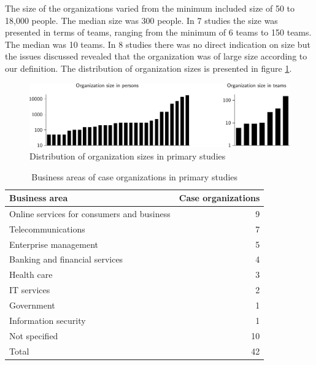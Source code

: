 \documentclass[preprint,authoryear,12pt]{elsarticle}
\begin{document}
The size of the organizations varied from the minimum included size of 50 to
18,000 people. The median size was 300 people. In 7 studies the size was
presented in terms of teams, ranging from the minimum of 6 teams to 150 teams.
The median was 10 teams. In 8 studies there was no direct indication on size
but the issues discussed revealed that the organization was of large size
according to our definition. The distribution of organization sizes is presented
in figure \ref{fig:organization_size}.

\begin{figure}[!t]
  \begin{center}
    \includegraphics[width=1\textwidth]{graphics/organization_size.pdf}
    \caption{Distribution of organization sizes in primary studies}
    \label{fig:organization_size}
  \end{center}
\end{figure}

\begin{table}[!t]
    \centering
    \begin{tabular}{ l r }
        \toprule
        Business area    &  Case organizations   \\
        \midrule
		Online services for consumers and business  &  9  \\
		Telecommunications                          &  7  \\
		Enterprise management                       &  5  \\
		Banking and financial services              &  4  \\
		Health care                                  &  3  \\
		IT services                                 &  2  \\
		Government                                  &  1  \\
		Information security                        &  1  \\
		Not specified                               & 10  \\
        \midrule
		Total                                       & 42  \\
        \bottomrule
    \end{tabular}
    \caption{Business areas of case organizations in primary studies}
    \label{table:businessareas}
\end{table}
\end{document}
